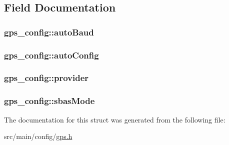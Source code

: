 \subsection{Field Documentation}
\hypertarget{structgps__config_af802fc33d04033d74ed42f29a423b9c6}{
\subsubsection[{auto\+Baud}]{ gps\+\_\+config\+::auto\+Baud}}\label{structgps__config_af802fc33d04033d74ed42f29a423b9c6}
\hypertarget{structgps__config_a7479c2e918573d8499fd247a577bc8c4}{
\subsubsection[{auto\+Config}]{ gps\+\_\+config\+::auto\+Config}}\label{structgps__config_a7479c2e918573d8499fd247a577bc8c4}
\hypertarget{structgps__config_a05b1d4246609271957a0b0cbe43807fb}{
\subsubsection[{provider}]{ gps\+\_\+config\+::provider}}\label{structgps__config_a05b1d4246609271957a0b0cbe43807fb}
\hypertarget{structgps__config_a9e75b1ad7065c6aa941e8261ab5845f9}{
\subsubsection[{sbas\+Mode}]{ gps\+\_\+config\+::sbas\+Mode}}\label{structgps__config_a9e75b1ad7065c6aa941e8261ab5845f9}


The documentation for this struct was generated from the following file\+:\begin{DoxyCompactItemize}
\item 
src/main/config/\hyperlink{config_2gps_8h}{gps.\+h}\end{DoxyCompactItemize}

